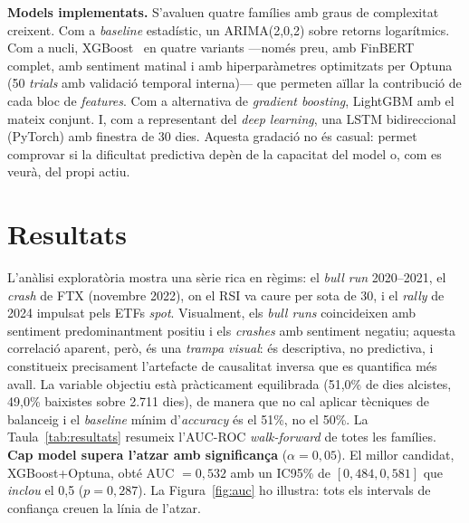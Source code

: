 \documentclass[10pt,twocolumn,a4paper]{article}
\begin{document}
\textbf{Models implementats.} S'avaluen quatre famílies amb graus de complexitat
creixent. Com a \textit{baseline} estadístic, un ARIMA(2,0,2) sobre retorns
logarítmics. Com a nucli, XGBoost~\cite{chen2016} en quatre variants ---només preu,
amb FinBERT complet, amb sentiment matinal i amb hiperparàmetres optimitzats per
Optuna (50 \textit{trials} amb validació temporal interna)--- que permeten aïllar la
contribució de cada bloc de \textit{features}. Com a alternativa de \textit{gradient
boosting}, LightGBM amb el mateix conjunt. I, com a representant del
\textit{deep learning}, una LSTM bidireccional (PyTorch) amb finestra de 30 dies.
Aquesta gradació no és casual: permet comprovar si la dificultat predictiva depèn de
la capacitat del model o, com es veurà, del propi actiu.

\section{Resultats}
L'anàlisi exploratòria mostra una sèrie rica en règims: el \textit{bull run}
2020--2021, el \textit{crash} de FTX (novembre 2022), on el RSI va caure per sota de
30, i el \textit{rally} de 2024 impulsat pels ETFs \textit{spot}. Visualment, els
\textit{bull runs} coincideixen amb sentiment predominantment positiu i els
\textit{crashes} amb sentiment negatiu; aquesta correlació aparent, però, és una
\emph{trampa visual}: és descriptiva, no predictiva, i constitueix precisament
l'artefacte de causalitat inversa que es quantifica més avall. La variable objectiu
està pràcticament equilibrada (51,0\% de dies alcistes, 49,0\% baixistes sobre 2.711
dies), de manera que no cal aplicar tècniques de balanceig i el \textit{baseline}
mínim d'\textit{accuracy} és el 51\%, no el 50\%.
La Taula~\ref{tab:resultats} resumeix l'AUC-ROC \textit{walk-forward} de totes les
famílies. \textbf{Cap model supera l'atzar amb significança} ($\alpha=0{,}05$). El
millor candidat, XGBoost+Optuna, obté AUC $= 0{,}532$ amb un IC95\% de
$[0{,}484, 0{,}581]$ que \emph{inclou} el 0,5 ($p = 0{,}287$). La
Figura~\ref{fig:auc} ho il\textperiodcentered{}lustra: tots els intervals de
confiança creuen la línia de l'atzar.
\end{document}
